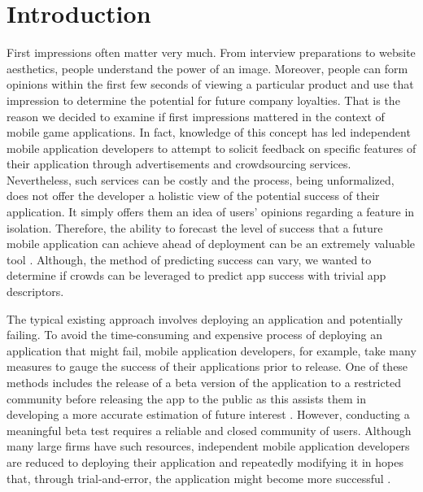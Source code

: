 \section{Introduction}


First impressions often matter very much. From interview preparations to website aesthetics, people understand the power of an image. Moreover, people can form opinions within the first few seconds of viewing a particular product and use that impression to determine the potential for future company loyalties. That is the reason we decided to examine if first impressions mattered in the context of mobile game applications. In fact, knowledge of this concept has led independent mobile application developers to attempt to solicit feedback on specific features of their application through advertisements and crowdsourcing services. Nevertheless, such services can be costly and the process, being unformalized, does not offer the developer a holistic view of the potential success of their application. It simply offers them an idea of users' opinions regarding a feature in isolation. Therefore, the ability to forecast the level of success that a future mobile application can achieve ahead of deployment can be an extremely valuable tool \cite{tohidi06:getting}. Although, the method of predicting success can vary, we wanted to determine if crowds can be leveraged to predict app success with trivial app descriptors.

The typical existing approach involves deploying an application and potentially failing. To avoid the time-consuming and expensive process of deploying an application that might fail, mobile application developers, for example, take many measures to gauge the success of their applications prior to release. One of these methods includes the release of a beta version of the application to a restricted community before releasing the app to the public as this assists them in developing a more accurate estimation of future interest \cite{betatest}. However, conducting a meaningful beta test requires a reliable and closed community of users. Although many large firms have such resources, independent mobile application developers are reduced to deploying their application and repeatedly modifying it in hopes that, through trial-and-error, the application might become more successful \cite{betatest}.

